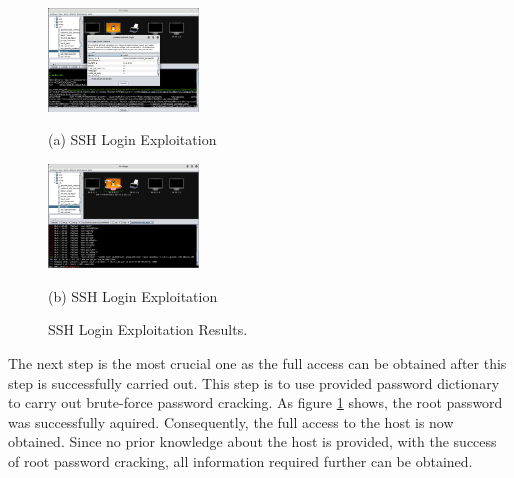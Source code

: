 \documentclass{article}
\begin{document}
\begin{figure}[H]
  \begin{minipage}[b]{.48\linewidth}
    \centering
    \centerline{\includegraphics[width=4.0cm]{kali7}}
    \centerline{(a) SSH Login Exploitation}\medskip
  \end{minipage}
  \hfill
  \begin{minipage}[b]{0.48\linewidth}
    \centering
    \centerline{\includegraphics[width=4.0cm]{kali8}}
    \centerline{(b) SSH Login Exploitation}\medskip
  \end{minipage}
  \caption{SSH Login Exploitation Results.}
  \label{kali7-8}
  \end{figure}
The next step is the most crucial one as the full access can be obtained after this step is successfully 
carried out. This step is to use provided password dictionary to carry out brute-force password cracking.
As figure \ref{kali7-8} shows, the root password was successfully aquired. Consequently, the full access to 
the host is now obtained.
Since no prior knowledge about the host is provided, with the success of root password cracking, 
all information required further can be obtained.








\vfill
\pagebreak

\vfill
\pagebreak



\end{document}
